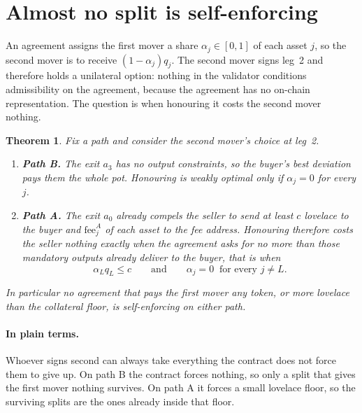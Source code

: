 \documentclass[11pt]{article}
\newtheorem{theorem}{Theorem}
\theoremstyle{remark}
\begin{document}
\section{Almost no split is self-enforcing}

An agreement assigns the first mover a share $\alpha_j \in [0,1]$ of each asset $j$, so the second mover is to
receive $(1-\alpha_j)q_j$. The second mover signs leg~2 and therefore holds a unilateral option: nothing in the
validator conditions admissibility on the agreement, because the agreement has no on-chain representation. The
question is when honouring it costs the second mover nothing.

\begin{theorem}
Fix a path and consider the second mover's choice at leg~2.
\begin{enumerate}[nosep,leftmargin=*]
\item \textbf{Path B.} The exit $a_3$ has no output constraints, so the buyer's best deviation pays them the whole
pot. Honouring is weakly optimal only if $\alpha_j = 0$ for every $j$.
\item \textbf{Path A.} The exit $a_0$ already compels the seller to send at least $c$ lovelace to the buyer and
$\text{fee}^{A}_j$ of each asset to the fee address. Honouring therefore costs the seller nothing exactly when the
agreement asks for no more than those mandatory outputs already deliver to the buyer, that is when
\[
\alpha_L q_L \le c \qquad\text{and}\qquad \alpha_j = 0 \ \text{ for every } j \neq L .
\]
\end{enumerate}
In particular no agreement that pays the first mover any token, or more lovelace than the collateral floor, is
self-enforcing on either path.
\end{theorem}

\paragraph{In plain terms.} Whoever signs second can always take everything the contract does not force them to give
up. On path B the contract forces nothing, so only a split that gives the first mover nothing survives. On path A it
forces a small lovelace floor, so the surviving splits are the ones already inside that floor.
\end{document}
